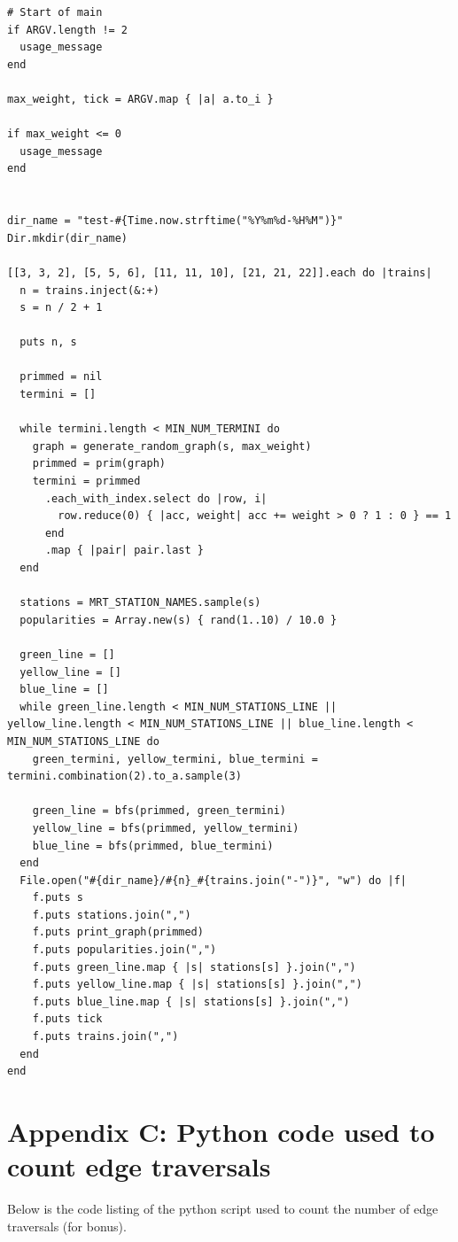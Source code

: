 \documentclass[a4paper,12pt]{article}
\begin{document}
\begin{verbatim}
# Start of main
if ARGV.length != 2
  usage_message
end

max_weight, tick = ARGV.map { |a| a.to_i }

if max_weight <= 0
  usage_message
end


dir_name = "test-#{Time.now.strftime("%Y%m%d-%H%M")}"
Dir.mkdir(dir_name)

[[3, 3, 2], [5, 5, 6], [11, 11, 10], [21, 21, 22]].each do |trains|
  n = trains.inject(&:+)
  s = n / 2 + 1

  puts n, s

  primmed = nil
  termini = []

  while termini.length < MIN_NUM_TERMINI do
    graph = generate_random_graph(s, max_weight)
    primmed = prim(graph)
    termini = primmed
      .each_with_index.select do |row, i|
        row.reduce(0) { |acc, weight| acc += weight > 0 ? 1 : 0 } == 1
      end
      .map { |pair| pair.last }
  end

  stations = MRT_STATION_NAMES.sample(s)
  popularities = Array.new(s) { rand(1..10) / 10.0 }

  green_line = []
  yellow_line = []
  blue_line = []
  while green_line.length < MIN_NUM_STATIONS_LINE || yellow_line.length < MIN_NUM_STATIONS_LINE || blue_line.length < MIN_NUM_STATIONS_LINE do
    green_termini, yellow_termini, blue_termini = termini.combination(2).to_a.sample(3)

    green_line = bfs(primmed, green_termini)
    yellow_line = bfs(primmed, yellow_termini)
    blue_line = bfs(primmed, blue_termini)
  end
  File.open("#{dir_name}/#{n}_#{trains.join("-")}", "w") do |f|
    f.puts s
    f.puts stations.join(",")
    f.puts print_graph(primmed)
    f.puts popularities.join(",")
    f.puts green_line.map { |s| stations[s] }.join(",")
    f.puts yellow_line.map { |s| stations[s] }.join(",")
    f.puts blue_line.map { |s| stations[s] }.join(",")
    f.puts tick
    f.puts trains.join(",")
  end
end
\end{verbatim}

\section*{Appendix C: Python code used to count edge traversals}
Below is the code listing of the python script used to count the number of edge traversals (for bonus).
\end{document}
